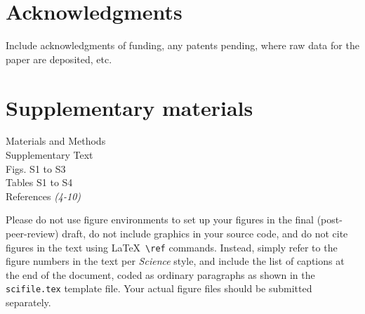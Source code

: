 \documentclass[12pt]{article}
\begin{document}









\section*{Acknowledgments}
Include acknowledgments of funding, any patents pending, where raw data for the paper are deposited, etc.

\section*{Supplementary materials}
Materials and Methods\\
Supplementary Text\\
Figs. S1 to S3\\
Tables S1 to S4\\
References \textit{(4-10)}




\clearpage

 Please do not use figure environments to set
up your figures in the final (post-peer-review) draft, do not include graphics in your
source code, and do not cite figures in the text using \LaTeX\
\verb+\ref+ commands.  Instead, simply refer to the figure numbers in
the text per {\it Science\/} style, and include the list of captions at
the end of the document, coded as ordinary paragraphs as shown in the
\texttt{scifile.tex} template file.  Your actual figure files should
be submitted separately.
\end{document}
